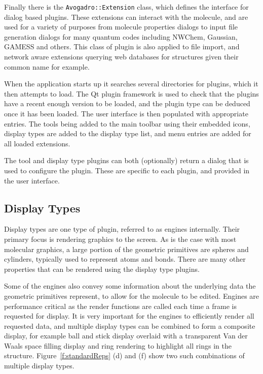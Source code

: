 \documentclass[10pt]{bmc_article}
\newenvironment{bmcformat}{\begin{raggedright}
\baselineskip20pt\sloppy\setboolean{publ}{false}}{\end{raggedright}
\baselineskip20pt\sloppy}
\begin{document}
\begin{bmcformat}
Finally there is the {\tt Avogadro::Extension} class, which defines the interface for
dialog based plugins. These extensions can interact with the molecule, and are
used for a variety of purposes from molecule properties dialogs to input file
generation dialogs for many quantum codes including NWChem, Gaussian, GAMESS and
others. This class of plugin is also applied to file import, and network aware
extensions querying web databases for structures given their common name for
example.

When the application starts up it searches several directories for plugins,
which it then attempts to load. The Qt plugin framework is used to check that
the plugins have a recent enough version to be loaded, and the plugin type can
be deduced once it has been loaded. The user interface is then populated with
appropriate entries. The tools being added to the main toolbar using their
embedded icons, display types are added to the display type list, and menu
entries are added for all loaded extensions.

The tool and display type plugins can both (optionally) return a dialog that is
used to configure the plugin. These are specific to each plugin, and provided in
the user interface.

\subsection{Display Types}

Display types are one type of plugin, referred to as engines internally. Their
primary focus is rendering graphics to the screen. As is the case with most
molecular graphics, a large portion of the geometric primitives are spheres and
cylinders, typically used to represent atoms and bonds. There are many other
properties that can be rendered using the display type plugins.

Some of the engines also convey some information about the underlying data the
geometric primitives represent, to allow for the molecule to be edited.
Engines are performance critical as the render functions are called each time a
frame is requested for display. It is very important for the engines to
efficiently render all requested data, and multiple display types can be
combined to form a composite display, for example ball and stick display
overlaid with a transparent Van der Waals space filling display and ring
rendering to highlight all rings in the structure. Figure~\ref{f:standardReps}
(d) and (f) show two such combinations of multiple display types.


\end{bmcformat}
\end{document}
